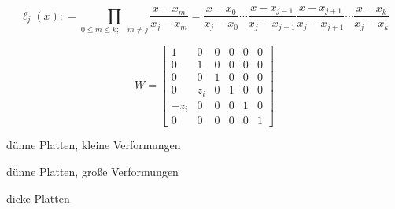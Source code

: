 \begin{equation}
	\ell_{j}(x): = \prod_{0 \leq m \leq k; \quad m \neq j}\frac{x - x_m}{x_j - x_m} = \frac {x - x_0}{x_j - x_0}\cdots \frac {x - x_{j - 1}}{x_j - x_{j - 1}}\frac {x - x_{j + 1}}{x_j - x_{j + 1}}\cdots \frac {x - x_k}{x_j - x_k}
\end{equation}

\begin{equation}
	W = 
	\begin{bmatrix}
		1    & 0   & 0 & 0 & 0 & 0 \\
		0    & 1   & 0 & 0 & 0 & 0 \\
		0    & 0   & 1 & 0 & 0 & 0 \\
		0    & z_i & 0 & 1 & 0 & 0 \\
		-z_i & 0   & 0 & 0 & 1 & 0 \\
		0    & 0   & 0 & 0 & 0 & 1
	\end{bmatrix}
\end{equation}

\begin{itemize*}
	\item dünne Platten, kleine Verformungen
	\item dünne Platten, große Verformungen
	\item dicke Platten
\end{itemize*}
